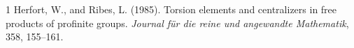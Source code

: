 \documentclass[11pt,a4paper]{article}
\begin{document}

\begin{thebibliography}{1}
Herfort, W., and Ribes, L. (1985).
Torsion elements and centralizers in free products of profinite groups.
\emph{Journal f\"ur die reine und angewandte Mathematik}, 358, 155--161.
\end{thebibliography}
\end{document}
